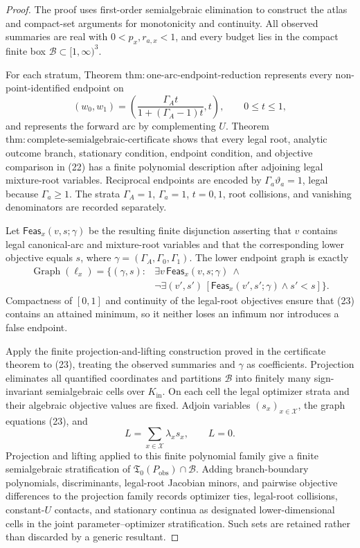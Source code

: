 \documentclass{article}
\begin{document}
\begin{proof}
The proof uses first-order semialgebraic elimination to construct the atlas and compact-set arguments for monotonicity and continuity.  All observed summaries are real with \(0<p_x,r_{a,x}<1\), and every budget lies in the compact finite box \(\mathcal B\subset[1,\infty)^3\).

For each stratum, Theorem \(\mathrm{thm{:}one\text{-}arc\text{-}endpoint\text{-}reduction}\) represents every non-point-identified endpoint on
\[
 (w_0,w_1)=\left(\frac{\Gamma_A t}{1+(\Gamma_A-1)t},t\right),
 \qquad 0\leq t\leq1,                                                   \tag{22}
\]
and represents the forward arc by complementing \(U\).  Theorem \(\mathrm{thm{:}complete\text{-}semialgebraic\text{-}certificate}\) shows that every legal root, analytic outcome branch, stationary condition, endpoint condition, and objective comparison in (22) has a finite polynomial description after adjoining legal mixture-root variables.  Reciprocal endpoints are encoded by \(\Gamma_a\vartheta_a=1\), legal because \(\Gamma_a\geq1\).  The strata \(\Gamma_A=1\), \(\Gamma_a=1\), \(t=0,1\), root collisions, and vanishing denominators are recorded separately.

Let \(\mathsf{Feas}_x(v,s;\gamma)\) be the resulting finite disjunction asserting that \(v\) contains legal canonical-arc and mixture-root variables and that the corresponding lower objective equals \(s\), where \(\gamma=(\Gamma_A,\Gamma_0,\Gamma_1)\).  The lower endpoint graph is exactly
\[
\begin{split}
 \operatorname{Graph}(\ell_x)=\{(\gamma,s):{}&
 \exists v\,\mathsf{Feas}_x(v,s;\gamma)\ \wedge\\
 &\neg\exists(v',s')\,[\mathsf{Feas}_x(v',s';\gamma)\wedge s'<s]\}.
\end{split}                                                             \tag{23}
\]
Compactness of \([0,1]\) and continuity of the legal-root objectives ensure that (23) contains an attained minimum, so it neither loses an infimum nor introduces a false endpoint.

Apply the finite projection-and-lifting construction proved in the certificate theorem to (23), treating the observed summaries and \(\gamma\) as coefficients.  Projection eliminates all quantified coordinates and partitions \(\mathcal B\) into finitely many sign-invariant semialgebraic cells over \(K_{\mathrm{in}}\).  On each cell the legal optimizer strata and their algebraic objective values are fixed.  Adjoin variables \((s_x)_{x\in\mathcal X}\), the graph equations (23), and
\[
 L=\sum_{x\in\mathcal X}\lambda_xs_x,
 \qquad L=0.                                                            \tag{24}
\]
Projection and lifting applied to this finite polynomial family give a finite semialgebraic stratification of \(\mathfrak T_0(P_{\mathrm{obs}})\cap\mathcal B\).  Adding branch-boundary polynomials, discriminants, legal-root Jacobian minors, and pairwise objective differences to the projection family records optimizer ties, legal-root collisions, constant-\(U\) contacts, and stationary continua as designated lower-dimensional cells in the joint parameter--optimizer stratification.  Such sets are retained rather than discarded by a generic resultant.


\end{proof}
\end{document}
